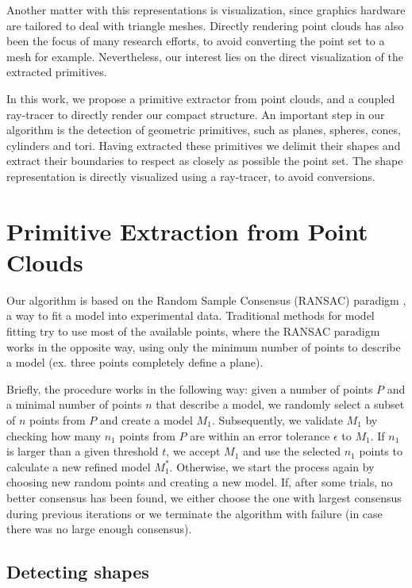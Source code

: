 \documentclass[10pt, conference]{IEEEtran}
\begin{document}
Another matter with this representations is visualization, since graphics hardware are tailored to deal with triangle meshes. Directly rendering point clouds has also been the focus of many research efforts, to avoid converting the point set to a mesh for example. Nevertheless, our interest lies on the direct visualization of the extracted primitives.

In this work, we propose a primitive extractor from point clouds, and a coupled ray-tracer to directly render our compact structure. An important step in our algorithm is the detection of geometric primitives, such as planes, spheres, cones, cylinders and tori. Having extracted these primitives we delimit their shapes and extract their boundaries to respect as closely as possible the point set. The shape representation is directly visualized using a ray-tracer, to avoid conversions.


\section{Primitive Extraction from Point Clouds}

Our algorithm is based on the Random Sample Consensus (RANSAC) paradigm \cite{Fischler81}, a way to fit a model into experimental data. Traditional methods for model fitting try to use most of the available points, where the RANSAC paradigm works in the opposite way, using only the minimum number of points to describe a model (ex. three points completely define a plane).

Briefly, the procedure works in the following way: given a number of points $P$ and a minimal number of points $n$ that describe a model, we randomly select a subset of $n$ points from $P$ and create a model $M_1$. Subsequently, we validate $M_1$ by checking how many $n_1$ points from $P$ are within an error tolerance $\epsilon$ to $M_1$. If $n_1$ is larger than a given threshold $t$, we accept $M_1$ and use the selected $n_1$ points to calculate a new refined model $M_1^*$. Otherwise, we start the process again by choosing new random points and creating a new model. If, after some trials, no better consensus has been found, we either choose the one with largest consensus during previous iterations or we terminate the algorithm with failure (in case there was no large enough consensus).

\subsection{Detecting shapes}
\end{document}
